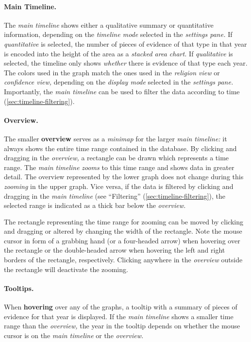 \paragraph{Main Timeline.}
The \emph{main timeline} shows either a qualitative summary or quantitative information, depending on the \emph{timeline mode} selected in the \emph{settings pane.}
If \emph{quantitative} is selected, the number of pieces of evidence of that type in that year is encoded into the height of the area as a \emph{stacked area chart.}
If \emph{qualitative} is selected, the timeline only shows \emph{whether} there is evidence of that type each year.
The colors used in the graph match the ones used in the \emph{religion view} or \emph{confidence view,} depending on the \emph{display mode} selected in the \emph{settings pane.}
Importantly, the \emph{main timeline} can be used to filter the data according to time (\cref{sec:timeline-filtering}).


\paragraph{Overview.}
The smaller \textbf{overview} serves as a \emph{minimap} for the larger \emph{main timeline:}
it always shows the entire time range contained in the database.
By clicking and dragging in the \emph{overview,} a rectangle can be drawn which represents a time range.
The \emph{main timeline} \emph{zooms} to this time range and shows data in greater detail.
The overview represented by the lower graph does not change during this \emph{zooming} in the upper graph.
Vice versa, if the data is filtered by clicking and dragging in the \emph{main timeline} (see \enquote{Filtering} (\cref{sec:timeline-filtering}), the selected range is indicated as a thick bar below the \emph{overview.}

The rectangle representing the time range for zooming can be moved by clicking and dragging or altered by changing the width of the rectangle.
Note the mouse cursor in form of a grabbing hand (or a four-headed arrow) when hovering over the rectangle or the double-headed arrow when hovering the left and right borders of the rectangle, respectively.
Clicking anywhere in the \emph{overview} outside the rectangle will deactivate the zooming.

\paragraph{Tooltips.}

When \textbf{hovering} over any of the graphs, a tooltip with a summary of pieces of evidence for that year is displayed.
If the \emph{main timeline} shows a smaller time range than the \emph{overview,} the year in the tooltip depends on whether the mouse cursor is on the \emph{main timeline} or the \emph{overview.}

